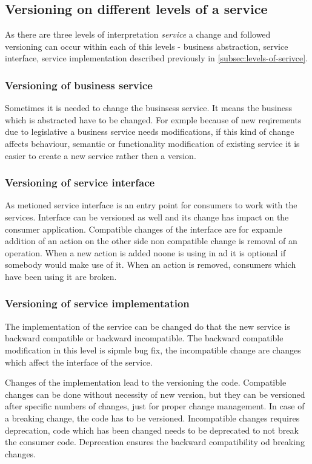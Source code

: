 \subsection{Versioning on different levels of a service}
As there are three levels of interpretation \emph{service} a change and followed versioning can occur within each of this levels - business abstraction, service interface, service implementation described previously in \ref{subsec:levels-of-serivce}.

\subsubsection{\textbf{Versioning of business service}}
Sometimes it is needed to change the businsess service. It means the business which is abstracted have to be changed. For exmple because of new reqirements due to legislative a business service needs modifications, if this kind of change affects behaviour, semantic or functionality modification of existing service it is easier to create a new service rather then a version. 

\subsubsection{\textbf{Versioning of service interface}}
As metioned service interface is an entry point for consumers to work with the services. Interface can be versioned as well and its change has impact on the consumer application. Compatible changes of the interface are for expamle addition of an action on the other side non compatible change is removal of an operation. When a new action is added noone is using in ad it is optional if somebody would make use of it. When an action is removed, consumers which have been using it are broken. 

\subsubsection{\textbf{Versioning of service implementation}}
The implementation of the service can be changed do that the new service is backward compatible or backward incompatible. The backward compatible modification in this level is sipmle bug fix, the incompatible change are changes which affect the interface of the service.

Changes of the implementation lead to the versioning the code. Compatible changes can be done without necessity of new version, but they can be versioned after specific numbers of changes, just for proper change management. In case of a breaking change, the code has to be versioned. Incompatible changes requires deprecation, code which has been changed needs to be deprecated to not break the consumer code. Deprecation ensures the backward compatibility od breaking changes.

